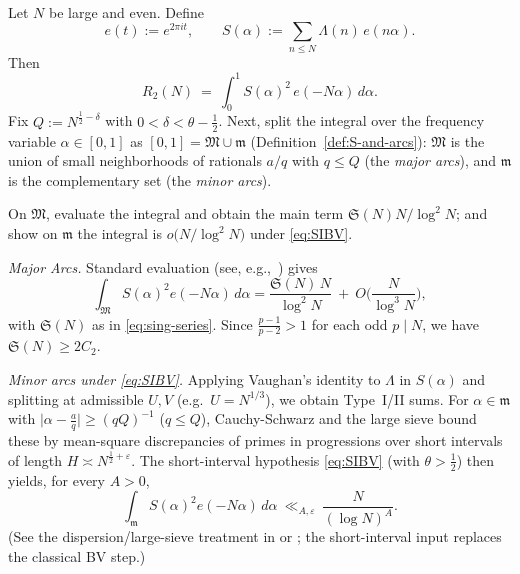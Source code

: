 \documentclass[11pt]{article}
\makeatletter
\theoremstyle{inline}
\theoremstyle{break}
\renewenvironment{proof}[1][\proofname]{%
  \par\pushQED{\qed}%
  \normalfont \topsep6\p@\@plus6\p@\relax
  \trivlist
  \item[\hskip\labelsep
        \itshape
    #1\@addpunct{.}]\mbox{}\\  %
}{%
  \popQED\endtrivlist\@endpefalse
}
\theoremstyle{break}
\theoremstyle{break}
\theoremstyle{break}
\theoremstyle{break}
\theoremstyle{break}
\theoremstyle{break}
\theoremstyle{inline}
\makeatother
\begin{document}
\begin{proof}
Let \(N\) be large and even. Define
\begin{equation}\label{eq:S-alpha}
e(t):=e^{2\pi i t},\qquad
S(\alpha):=\sum_{n\le N}\Lambda(n)\,e(n\alpha).
\end{equation}
Then
\begin{equation}\label{eq:R2-int-again}
R_2(N)\ =\ \int_0^1 S(\alpha)^2\,e(-N\alpha)\,d\alpha.
\end{equation}
Fix \(Q:=N^{\frac{1}{2}-\delta}\) with \(0<\delta<\theta-\tfrac12\).  Next, split the integral over the frequency variable \(\alpha\in[0,1]\) as
\([0,1]=\mathfrak M\cup\mathfrak m\) (Definition~\ref{def:S-and-arcs}): 
\(\mathfrak M\) is the union of small neighborhoods of rationals \(a/q\) with \(q\le Q\) (the \emph{major arcs}), and \(\mathfrak m\) is the complementary set (the \emph{minor arcs}).

On \(\mathfrak M\), evaluate the integral and obtain the main term \(\mathfrak S(N)N/\log^2 N\); 
and show on \(\mathfrak m\) the integral is \(o\!\big(N/\log^2 N\big)\) under \eqref{eq:SIBV}.

\medskip\noindent\emph{Major Arcs.}
Standard evaluation (see, e.g.,~\cite[Thm.~13.12]{MontgomeryVaughan2007}) gives
\begin{equation}\label{eq:major-arc-again}
\int_{\mathfrak M} S(\alpha)^2 e(-N\alpha)\,d\alpha
=\frac{\mathfrak S(N)\,N}{\log^2 N}\ +\ O\!\Big(\frac{N}{\log^3 N}\Big),
\end{equation}
with \(\mathfrak S(N)\) as in \eqref{eq:sing-series}. Since \(\frac{p-1}{p-2}>1\) for each odd \(p\mid N\), we have \(\mathfrak S(N)\ge 2C_2\).

\medskip\noindent\emph{Minor arcs under \eqref{eq:SIBV}.}
Applying Vaughan’s identity to \(\Lambda\) in \(S(\alpha)\) and splitting at admissible \(U,V\) (e.g.\ \(U=N^{1/3}\)), we obtain Type~I/II sums. For \(\alpha\in\mathfrak m\) with \(\bigl|\alpha-\tfrac{a}{q}\bigr|\ge (qQ)^{-1}\) (\(q\le Q\)), Cauchy-Schwarz and the large sieve bound these by mean-square discrepancies of primes in progressions over short intervals of length \(H\asymp N^{\frac{1}{2}+\varepsilon}\). The short-interval hypothesis \eqref{eq:SIBV} (with \(\theta>\tfrac12\)) then yields, for every \(A>0\),
\begin{equation}\label{eq:major-arc-again}
\int_{\mathfrak m} S(\alpha)^2 e(-N\alpha)\,d\alpha\ \ll_{A,\varepsilon}\ \frac{N}{(\log N)^A}.
\end{equation}
(See the dispersion/large-sieve treatment in \cite[Chs.~17-18]{IwaniecKowalski2004} or \cite[Chs.~17,\,28]{Harman2007}; the short-interval input replaces the classical BV step.)


\end{proof}
\end{document}
